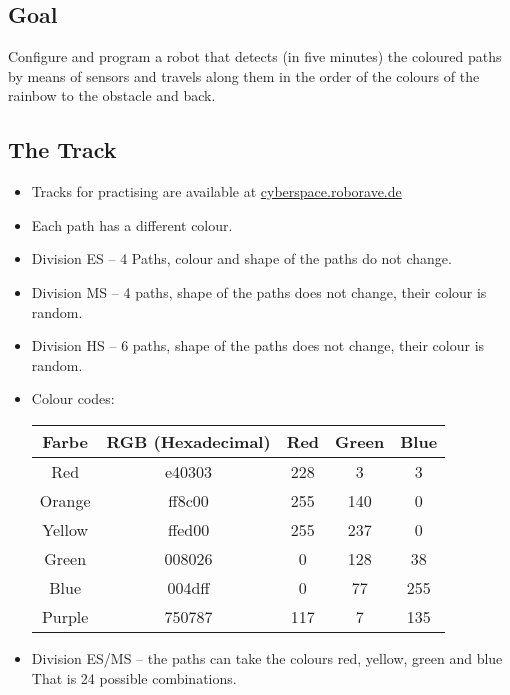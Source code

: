 \documentclass[a4paper,12pt]{article}
\begin{document}
\subsection{Goal}

Configure and program a robot that detects (in five minutes) the coloured paths
by means of sensors and travels along them in the order of the colours of the
rainbow to the obstacle and back.

\subsection{The Track}

\begin{itemize}
	\item Tracks for practising are available at
\href{https://cyberspace.roborave.de}{cyberspace.roborave.de}
	\item Each path has a different colour.
	\item Division ES – 4 Paths, colour and shape of the paths do not
		change.
	\item Division MS – 4 paths, shape of the paths does not change, their
		colour is random.
	\item Division HS – 6 paths, shape of the paths does not change, their
		colour is random.
	\item Colour codes:
\begin{center}
	\begin{tabular}{|c|c|c|c|c|} \hline
		Farbe & RGB (Hexadecimal) & Red & Green & Blue \\ \hline
    		Red & e40303 & 228 & 3 & 3 \\
    		Orange & ff8c00 & 255 & 140 & 0 \\
    		Yellow & ffed00 & 255 & 237 & 0 \\
    		Green & 008026 & 0 & 128 & 38 \\
    		Blue & 004dff & 0 & 77 & 255 \\
    		Purple & 750787 & 117 & 7 & 135 \\ \hline
	\end{tabular}
\end{center}
	\item Division ES/MS – the paths can take the colours red, yellow,
		green and blue That is 24 possible combinations.


\end{itemize}
\end{document}

